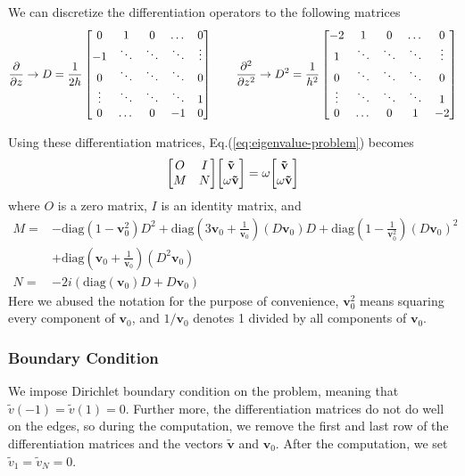 We can discretize the differentiation operators to the following matrices
\[
	\pdv{z} \rightarrow D = \frac{1}{2h}\begin{bmatrix}
		0      & 1      & 0      & \dots  & 0      \\
		-1     & \ddots & \ddots & \ddots & \vdots \\
		0      & \ddots & \ddots & \ddots & 0      \\
		\vdots & \ddots & \ddots & \ddots & 1      \\
		0      & \dots  & 0      & -1     & 0
	\end{bmatrix}
	\qquad
	\pdv[2]{z} \rightarrow  D^2 = \frac{1}{h^2}\begin{bmatrix}
		-2     & 1      & 0      & \dots  & 0      \\
		1      & \ddots & \ddots & \ddots & \vdots \\
		0      & \ddots & \ddots & \ddots & 0      \\
		\vdots & \ddots & \ddots & \ddots & 1      \\
		0      & \dots  & 0      & 1      & -2
	\end{bmatrix}
\]

Using these differentiation matrices, Eq.(\ref{eq:eigenvalue-problem}) becomes
\begin{equation}
	\mqty[ O & I\\ M & N ]\mqty[ \mathbf{\tilde{v}}\\ \omega\mathbf{\tilde{v}} ] = \omega\mqty[ \mathbf{\tilde{v}}\\ \omega\mathbf{\tilde{v}} ]
\end{equation}
where $O$ is a zero matrix, $I$ is an identity matrix, and
\begin{align*}
	M = & -\text{diag}(1-\mathbf{v}_0^2)D^2
	+\text{diag}\left(3\mathbf{v}_0 + \frac{1}{\mathbf{v}_0}\right) (D\mathbf{v}_0)D
	+\text{diag}\left(1-\frac{1}{\mathbf{v}_0^2}\right)\left(D\mathbf{v}_0\right)^2     \\
	    & +\text{diag}\left(\mathbf{v}_0+\frac{1}{\mathbf{v}_0}\right)(D^2\mathbf{v}_0) \\
	N = & -2i\left(\text{diag}(\mathbf{v}_0)D + D\mathbf{v}_0 \right)
\end{align*}
Here we abused the notation for the purpose of convenience, $\mathbf{v}_0^2$ means squaring every component of $\mathbf{v}_0$, and $1/\mathbf{v}_0$ denotes 1 divided by all components of $\mathbf{v}_0$.

\subsubsection{Boundary Condition}
We impose Dirichlet boundary condition on the problem, meaning that $\tilde{v}(-1)=\tilde{v}(1)=0$. Further more, the differentiation matrices do not do well on the edges, so during the computation, we remove the first and last row of the differentiation matrices and the vectors $\mathbf{\tilde{v}}$ and $\mathbf{v}_0$. After the computation, we set $\tilde{v}_1=\tilde{v}_N = 0$.

